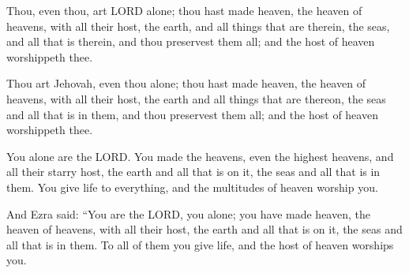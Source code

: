 			Thou, even thou, art LORD alone; thou hast made heaven, the heaven of heavens, with all their host, the earth, and all things that are therein, the seas, and all that is therein, and thou preservest them all; and the host of heaven worshippeth thee.

			\begin{versebox}
					\item[BHS] 
					\item[LXX] 
					\item[ASV] Thou art Jehovah, even thou alone; thou hast made heaven, the heaven of heavens, with all their host, the earth and all things that are thereon, the seas and all that is in them, and thou preservest them all; and the host of heaven worshippeth thee.
					\item[NIV] You alone are the LORD. You made the heavens, even the highest heavens, and all their starry host, the earth and all that is on it, the seas and all that is in them. You give life to everything, and the multitudes of heaven worship you.
					\item[NRSV] And Ezra said: “You are the LORD, you alone; you have made heaven, the heaven of heavens, with all their host, the earth and all that is on it, the seas and all that is in them. To all of them you give life, and the host of heaven worships you.
			\end{versebox}

